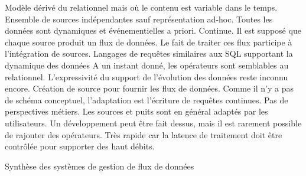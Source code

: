 \begin{table}[!ht]
\criteretabDonnee
    {Modèle dérivé du relationnel mais où le contenu est variable dans le temps.}
    {Ensemble de sources indépendantes sauf représentation ad-hoc.}
    {Toutes les données sont dynamiques et événementielles a priori.}
\criteretabTraitement
    {Continue.}
    {Il est supposé que chaque source produit un flux de données. Le fait de traiter ces flux participe à l'intégration de sources.}
    {Langages de requêtes similaires aux SQL supportant la dynamique des données}
    {A un instant donné, les opérateurs sont semblables au relationnel. L'expressivité du support de l'évolution des données reste inconnu encore.}
\criteretabAdaptabilite
    {Création de source pour fournir les flux de données. Comme il n'y a pas de schéma conceptuel, l'adaptation est l'écriture de requêtes continues.}
    {Pas de perspectives métiers.}
    {Les sources et puits sont en général adaptés par les utilisateurs. Un développement peut être fait dessus, mais il est rarement possible de rajouter des opérateurs.}
    {Très rapide car la latence de traitement doit être contrôlée pour supporter des haut débits.}
\caption{Synthèse des systèmes de gestion de flux de données}\label{tab:rw:supervision:sgfd:synthese}
\end{table}
